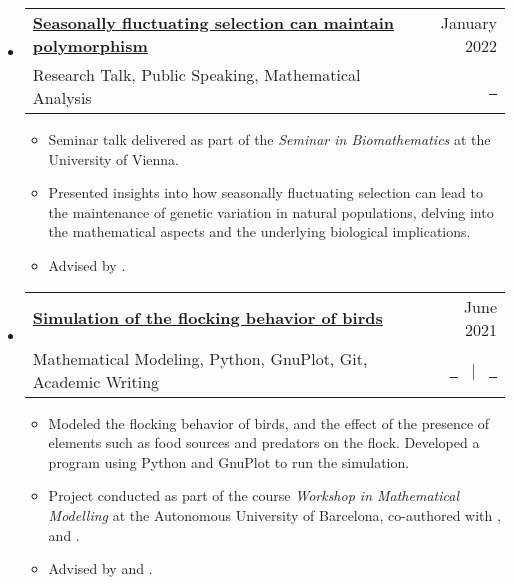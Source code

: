 \documentclass[a4paper,10pt]{article}
\makeatletter
\newcommand{\resumeItemListEnd}{\end{itemize}}
\newcommand{\resumeQuadHeading}[4]{
  \item
  \begin{tabular*}{0.96\textwidth}[t]{l@{\extracolsep{\fill}}r}
    \textbf{#1} & \small #2 \\
    \small#3 & \small #4 \\
  \end{tabular*}
}
\newcommand{\resumeHeadingListStart}{
  \begin{itemize}[leftmargin=0.15in, label={}]
}
\newcommand{\resumeHeadingListEnd}{\end{itemize}}
\makeatother
\begin{document}
  \resumeHeadingListStart{}
    \resumeQuadHeading{\href{https://github.com/loredanasandu/seminar-talk-biomathematics/blob/main/SanduLoredana_Presentation_SE_Biomathematics-Seasonally_fluctuating_selection_and_polymorphism.pdf}{Seasonally fluctuating selection can maintain polymorphism}}{January 2022}{Research Talk, Public Speaking, Mathematical Analysis}{\href{https://github.com/loredanasandu/seminar-talk-biomathematics/blob/main/SanduLoredana_Presentation_SE_Biomathematics-Seasonally_fluctuating_selection_and_polymorphism.pdf}{\faFileTextO \ \graydotuline{Slides}}}
    \begin{itemize}[leftmargin=3em, itemsep=0.1em, topsep=2pt]
      \item \small Seminar talk delivered as part of the \textit{Seminar in Biomathematics} at the University of Vienna.
      \item \small Presented insights into how seasonally fluctuating selection can lead to the maintenance of genetic variation in natural populations, delving into the mathematical aspects and the underlying biological implications.
      \item \small Advised by \href{https://ufind.univie.ac.at/en/person.html?id=33917}{}.
    \end{itemize}
  \resumeItemListEnd{}

  \resumeHeadingListStart{}
    \resumeQuadHeading{\href{https://github.com/loredanasandu/bird-flocks-simulation}{Simulation of the flocking behavior of birds}}{June 2021}{Mathematical Modeling, Python, GnuPlot, Git, Academic Writing}{\href{https://github.com/loredanasandu/bird-flocks-simulation/blob/main/report.pdf}{\faFileTextO \ \graydotuline{{Report \scriptsize (in Catalan)}}} \ $|$ \ \href{https://github.com/loredanasandu/bird-flocks-simulation}{\faGithub \ \graydotuline{Code}}}
    \begin{itemize}[leftmargin=3em, itemsep=0.1em, topsep=2pt]
      \item \small Modeled the flocking behavior of birds, and the effect of the presence of elements such as food sources and predators on the flock. Developed a program using Python and GnuPlot to run the simulation.
      \item \small Project conducted as part of the course \textit{Workshop in Mathematical Modelling} at the Autonomous University of Barcelona, co-authored with \href{https://www.linkedin.com/in/anna-danot-14a10b252}{}, \href{https://www.linkedin.com/in/nuria-fernandez-raventos/}{} and \href{https://www.linkedin.com/in/jan-mousavi-facundo/}{}.
      \item \small Advised by \href{https://mat.uab.cat/departament/uab/pop_ex.php?id=172&lang=cat}{} and \href{https://mat.uab.cat/departament/uab/pop_ex.php?id=208&lang=}{}.
    \end{itemize}
  \resumeHeadingListEnd{}
\end{document}
